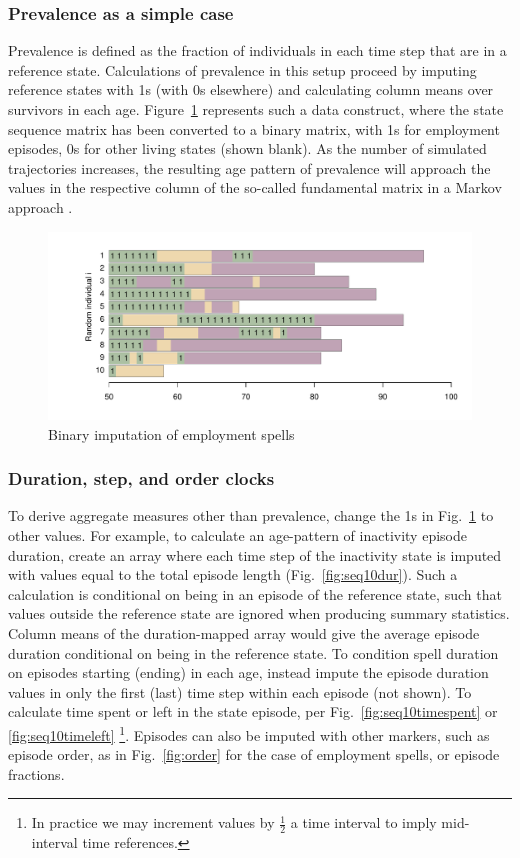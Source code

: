 \documentclass[a4paper,left=1.25cm,right=1.25cm,top=1.25cm,bottom=1.25cm]{article}
\begin{document}
\subsubsection{Prevalence as a simple case}
Prevalence is defined as the fraction of individuals in each time step that are in a reference state. Calculations of prevalence in this setup proceed by imputing reference states with 1s (with 0s elsewhere) and calculating column means over survivors in each age. Figure~\ref{fig:seq10ones} represents such a data construct, where the state sequence matrix has been converted to a binary matrix, with 1s for employment episodes, 0s for other living states (shown blank). As the number of simulated trajectories increases, the resulting age pattern of prevalence will approach the values in the respective column of the so-called fundamental matrix in a Markov approach \citep{caswell2018matrix}.

\begin{figure}[ht!]
\centering
\includegraphics[scale=.5]{Figures/Seq10ones.pdf}
\caption{Binary imputation of employment spells}
\label{fig:seq10ones}
\end{figure}

\subsubsection{Duration, step, and order clocks}
To derive aggregate measures other than prevalence, change the 1s in Fig.~\ref{fig:seq10ones} to other values. For example, to calculate an age-pattern of inactivity episode duration, create an array where each time step of the inactivity state is imputed with values equal to the total episode length (Fig.~\ref{fig:seq10dur}). Such a calculation is conditional on being in an episode of the reference state, such that values outside the reference state are ignored when producing summary statistics. Column means of the duration-mapped array would give the average episode duration conditional on being in the reference state. 
To condition spell duration on episodes starting (ending) in each age, instead impute the episode duration values in only the first (last) time step within each episode (not shown). To calculate time spent or left in the state episode, per Fig.~\ref{fig:seq10timespent} or \ref{fig:seq10timeleft} \footnote{In practice we may increment values by $\frac{1}{2}$ a time interval to imply mid-interval time references.}. Episodes can also be imputed with other markers, such as episode order, as in Fig.~\ref{fig:order} for the case of employment spells, or episode fractions. 
\end{document}
